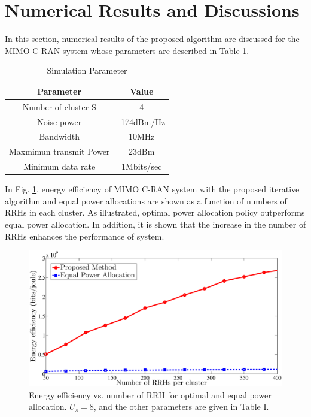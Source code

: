 \documentclass[journal,onecolumn,11pt,draftcls,doublespace]{IEEEtran}
\begin{document}
\section{Numerical Results and Discussions}
In this section, numerical results of the proposed algorithm are discussed for the MIMO C-RAN system whose parameters are described in Table \ref{tab:title}.

 \begin{table}[H]
 \caption {Simulation Parameter} \label{tab:title} 
 \begin{center}
  \begin{tabular}{||c c ||} 
  \hline
  Parameter & Value \\ [0.5ex] 
  \hline\hline
  Number of cluster S & 4 \\ 
  \hline
  Noise power & -174dBm/Hz\\
  \hline
  Bandwidth & 10MHz \\
  \hline
 Maxmimun transmit Power & 23dBm \\
  \hline
  Minimum data rate &  1Mbits/sec \\ [1ex] 
  \hline
 \end{tabular}
 \end{center}
 \end{table}
 
 
In Fig. \ref{fig:nem1},
energy efficiency of MIMO C-RAN system with the proposed iterative algorithm and equal power allocations are shown as a function of numbers of RRHs in each cluster.
As illustrated, optimal power allocation policy outperforms equal power allocation. In addition, it is shown that the increase in the number of RRHs enhances the performance of system.
 
  \begin{figure}
  \centering
    \includegraphics[width=0.5\linewidth, height=6cm]{n1232}
  \caption{Energy efficiency vs. number of RRH for optimal and equal power allocation. $U_s=8$, and the other parameters are given in Table I.}
  \label{fig:nem1}
\end{figure}
\end{document}

